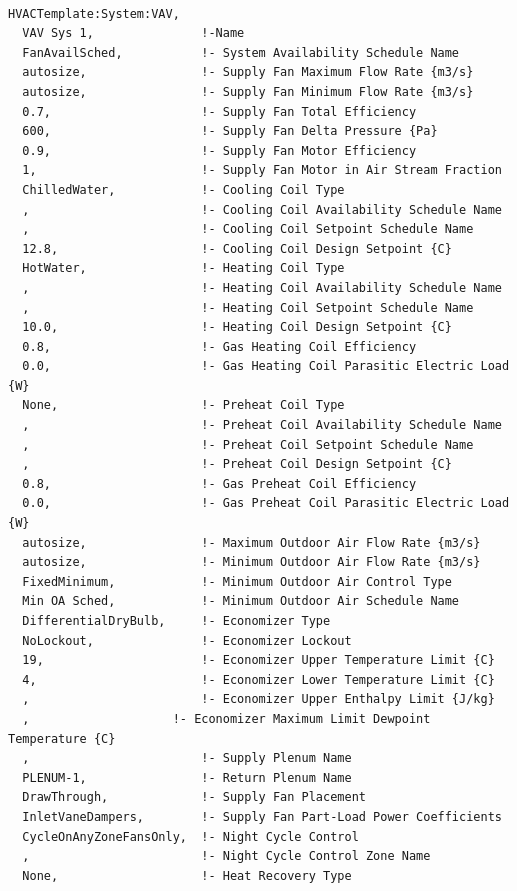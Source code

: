 \begin{lstlisting}

HVACTemplate:System:VAV,
  VAV Sys 1,               !-Name
  FanAvailSched,           !- System Availability Schedule Name
  autosize,                !- Supply Fan Maximum Flow Rate {m3/s}
  autosize,                !- Supply Fan Minimum Flow Rate {m3/s}
  0.7,                     !- Supply Fan Total Efficiency
  600,                     !- Supply Fan Delta Pressure {Pa}
  0.9,                     !- Supply Fan Motor Efficiency
  1,                       !- Supply Fan Motor in Air Stream Fraction
  ChilledWater,            !- Cooling Coil Type
  ,                        !- Cooling Coil Availability Schedule Name
  ,                        !- Cooling Coil Setpoint Schedule Name
  12.8,                    !- Cooling Coil Design Setpoint {C}
  HotWater,                !- Heating Coil Type
  ,                        !- Heating Coil Availability Schedule Name
  ,                        !- Heating Coil Setpoint Schedule Name
  10.0,                    !- Heating Coil Design Setpoint {C}
  0.8,                     !- Gas Heating Coil Efficiency
  0.0,                     !- Gas Heating Coil Parasitic Electric Load {W}
  None,                    !- Preheat Coil Type
  ,                        !- Preheat Coil Availability Schedule Name
  ,                        !- Preheat Coil Setpoint Schedule Name
  ,                        !- Preheat Coil Design Setpoint {C}
  0.8,                     !- Gas Preheat Coil Efficiency
  0.0,                     !- Gas Preheat Coil Parasitic Electric Load {W}
  autosize,                !- Maximum Outdoor Air Flow Rate {m3/s}
  autosize,                !- Minimum Outdoor Air Flow Rate {m3/s}
  FixedMinimum,            !- Minimum Outdoor Air Control Type
  Min OA Sched,            !- Minimum Outdoor Air Schedule Name
  DifferentialDryBulb,     !- Economizer Type
  NoLockout,               !- Economizer Lockout
  19,                      !- Economizer Upper Temperature Limit {C}
  4,                       !- Economizer Lower Temperature Limit {C}
  ,                        !- Economizer Upper Enthalpy Limit {J/kg}
  ,                    !- Economizer Maximum Limit Dewpoint Temperature {C}
  ,                        !- Supply Plenum Name
  PLENUM-1,                !- Return Plenum Name
  DrawThrough,             !- Supply Fan Placement
  InletVaneDampers,        !- Supply Fan Part-Load Power Coefficients
  CycleOnAnyZoneFansOnly,  !- Night Cycle Control
  ,                        !- Night Cycle Control Zone Name
  None,                    !- Heat Recovery Type

\end{lstlisting}
